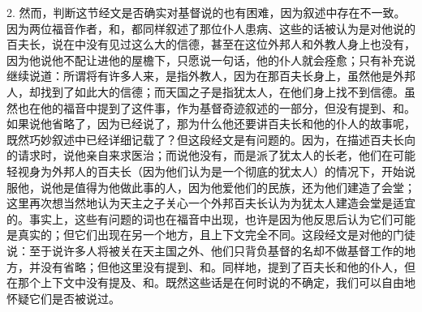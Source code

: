 2. 然而，判断这节经文是否确实对基督说的也有困难，因为叙述中存在不一致。因为两位福音作者，和，都同样叙述了那位仆人患病、这些的话被认为是对他说的百夫长，说在中没有见过这么大的信德，甚至在这位外邦人和外教人身上也没有，因为他说他不配让进他的屋檐下，只愿说一句话，他的仆人就会痊愈；只有补充说继续说道：所谓将有许多人来，是指外教人，因为在那百夫长身上，虽然他是外邦人，却找到了如此大的信德；而天国之子是指犹太人，在他们身上找不到信德。虽然也在他的福音中提到了这件事，作为基督奇迹叙述的一部分，但没有提到、和。如果说他省略了，因为已经说了，那为什么他还要讲百夫长和他的仆人的故事呢，既然巧妙叙述中已经详细记载了？但这段经文是有问题的。因为，在描述百夫长向的请求时，说他亲自来求医治；而说他没有，而是派了犹太人的长老，他们在可能轻视身为外邦人的百夫长（因为他们认为是一个彻底的犹太人）的情况下，开始说服他，说他是值得为他做此事的人，因为他爱他们的民族，还为他们建造了会堂；这里再次想当然地认为天主之子关心一个外邦百夫长认为为犹太人建造会堂是适宜的。事实上，这些有问题的词也在福音中出现，也许是因为他反思后认为它们可能是真实的；但它们出现在另一个地方，且上下文完全不同。这段经文是对他的门徒说：至于说许多人将被关在天主国之外、他们只背负基督的名却不做基督工作的地方，并没有省略；但他这里没有提到、和。同样地，提到了百夫长和他的仆人，但在那个上下文中没有提及、和。既然这些话是在何时说的不确定，我们可以自由地怀疑它们是否被说过。\par

